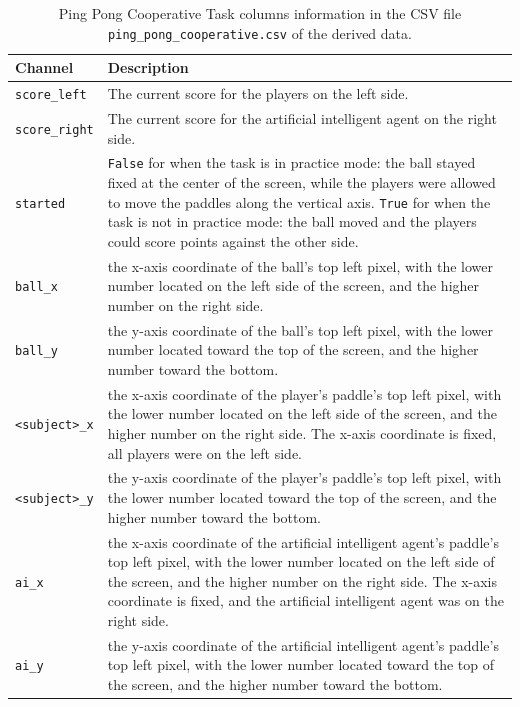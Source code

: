 \begin{table}[h]
\centering
\begin{tabularx}{\textwidth}{lX}
\toprule
Channel & Description \\
\midrule
\texttt{score\_left} & The current score for the players on the left side.\\
\texttt{score\_right} & The current score for the artificial intelligent agent on the right side.\\
\texttt{started} & \texttt{False} for when the task is in practice mode: the ball stayed fixed at the center of the screen, while the players were allowed to move the paddles along the vertical axis. \texttt{True} for when the task is not in practice mode: the ball moved and the players could score points against the other side.\\
\texttt{ball\_x} & the x-axis coordinate of the ball's top left pixel, with the lower number located on the left side of the screen, and the higher number on the right side.\\
\texttt{ball\_y} & the y-axis coordinate of the ball's top left pixel, with the lower number located toward the top  of the screen, and the higher number toward the bottom.\\
\texttt{<subject>\_x} & the x-axis coordinate of the player's paddle's top left pixel, with the lower number located on the left side of the screen, and the higher number on the right side. The x-axis coordinate is fixed, all players were on the left side.\\
\texttt{<subject>\_y} & the y-axis coordinate of the player's paddle's top left pixel, with the lower number located toward the top of the screen, and the higher number toward the bottom.\\
\texttt{ai\_x} & the x-axis coordinate of the artificial intelligent agent's paddle's top left pixel, with the lower number located on the left side of the screen, and the higher number on the right side. The x-axis coordinate is fixed, and the artificial intelligent agent was on the right side.\\
\texttt{ai\_y} & the y-axis coordinate of the artificial intelligent agent's paddle's top left pixel, with the lower number located toward the top of the screen, and the higher number toward the bottom.\\
\bottomrule
\end{tabularx}
\caption{Ping Pong Cooperative Task columns information in the CSV file \texttt{ping\_pong\_cooperative.csv} of the derived data.}
\label{tab:ping_pong_cooperative_task_columns}
\end{table}

